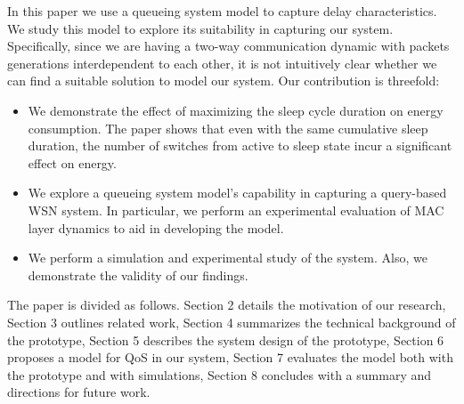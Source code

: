 In this paper we use a queueing system model to capture delay characteristics. We study this model to explore its suitability in capturing our system. Specifically, since we are having a two-way communication dynamic with packets generations interdependent to each other, it is not intuitively clear whether we can find a suitable solution to model our system. Our contribution is threefold:
\begin{itemize}
\item{We demonstrate the effect of maximizing the sleep cycle duration on energy consumption. The paper shows that even with the same cumulative sleep duration, the number of switches from active to sleep state incur a significant effect on energy.}
\item{We explore a queueing system model's capability in capturing a query-based WSN system. In particular, we perform an experimental evaluation of MAC layer dynamics to aid in developing the model.}
\item{We perform a simulation and experimental study of the system. Also, we demonstrate the validity of our findings.}
\end{itemize}

The paper is divided as follows. Section 2 details the motivation of our research, Section 3 outlines related work, Section 4 summarizes the technical background of the prototype, Section 5 describes the system design of the prototype, Section 6 proposes a model for QoS in our system, Section 7 evaluates the model both with the prototype and with simulations, Section 8 concludes with a summary and directions for future work.
